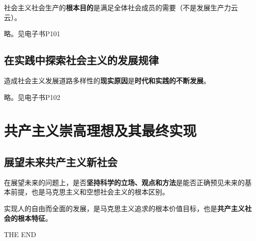 \documentclass[12pt, a4paper, oneside]{ctexart}
\begin{document}
社会主义社会生产的\textbf{根本目的}是满足全体社会成员的需要（不是发展生产力云云）。

略。见电子书P101

\subsection{在实践中探索社会主义的发展规律}

造成社会主义发展道路多样性的\textbf{现实原因}是\textbf{时代和实践的不断发展}。

略。见电子书P102

\section{共产主义崇高理想及其最终实现}

\subsection{展望未来共产主义新社会}

在展望未来的问题上，是否\textbf{坚持科学的立场、观点和方法}是能否正确预见未来的基本前提，也是马克思主义和空想社会主义的根本区别。

实现人的自由而全面的发展，是马克思主义追求的根本价值目标，也是\textbf{共产主义社会的根本特征}。

\vspace*{30pt}

\begin{center}
  \Large{THE END}
\end{center}
\end{document}
